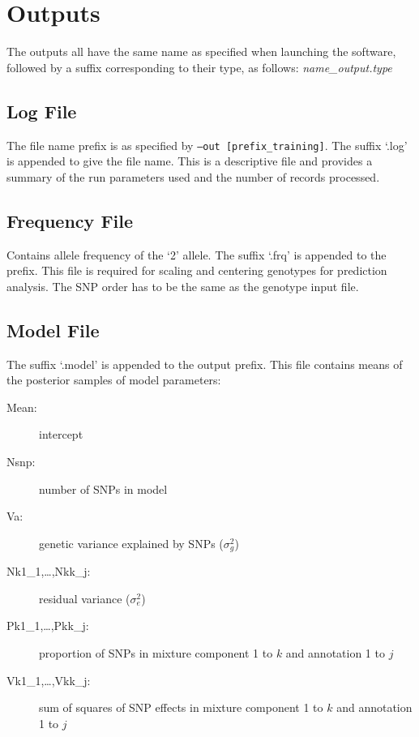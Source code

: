 \documentclass{ol-softwaremanual}
\begin{document}
 


\section{Outputs}

The outputs all have the same name as specified when launching the software, followed by a suffix corresponding to their type, as follows: \textit{name\_output.type}

\subsection{Log File}

The file name prefix is as specified by \texttt{–out [prefix\_training]}. The suffix ‘.log’ is appended to give the file name. This is a descriptive file and provides a summary of the run parameters used and the number of records processed.  

\subsection{Frequency File}

Contains allele frequency of the ‘2’ allele. The suffix ‘.frq’ is appended to the prefix. This file is required for scaling and centering genotypes for prediction analysis. The SNP order has to be the same as the genotype input file.  

\subsection{Model File}

The suffix ‘.model’ is appended to the output prefix. This file contains means of the posterior samples of model parameters:
\begin{description}
\item[Mean:] intercept
\item[Nsnp:] number of SNPs in model 
\item[Va:] genetic variance explained by SNPs ($\sigma_g^2$)
\item[Nk1\_1,…,Nkk\_j:] residual variance ($\sigma_e^2$)
\item[Pk1\_1,…,Pkk\_j:] proportion of SNPs in mixture component 1 to $k$ and annotation 1 to $j$
\item[Vk1\_1,…,Vkk\_j:] sum of squares of SNP effects in mixture component 1 to $k$ and annotation 1 to $j$ 

\end{description}
\end{document}
